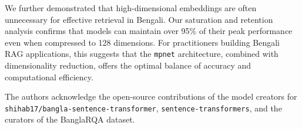 \documentclass[manuscript,screen,review]{acmart}
\begin{document}
We further demonstrated that high-dimensional embeddings are often unnecessary for effective retrieval in Bengali. Our saturation and retention analysis confirms that models can maintain over 95\% of their peak performance even when compressed to 128 dimensions. For practitioners building Bengali RAG applications, this suggests that the \texttt{mpnet} architecture, combined with dimensionality reduction, offers the optimal balance of accuracy and computational efficiency.

\begin{acks}
The authors acknowledge the open-source contributions of the model creators for \texttt{shihab17/bangla-sentence-transformer}, \texttt{sentence-transformers}, and the curators of the BanglaRQA dataset.
\end{acks}
\end{document}
